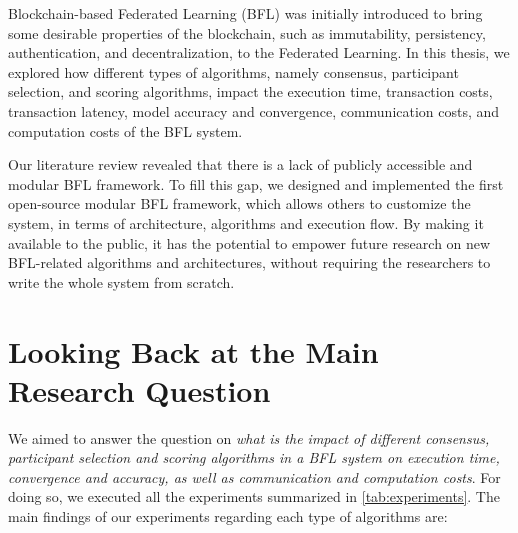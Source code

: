 Blockchain-based Federated Learning (BFL) was initially introduced to bring some desirable properties of the blockchain, such as immutability, persistency, authentication, and decentralization, to the Federated Learning. In this thesis, we explored how different types of algorithms, namely consensus, participant selection, and scoring algorithms, impact the execution time, transaction costs, transaction latency, model accuracy and convergence, communication costs, and computation costs of the BFL system.

Our literature review revealed that there is a lack of publicly accessible and modular BFL framework. To fill this gap, we designed and implemented the first open-source modular BFL framework, which allows others to customize the system, in terms of architecture, algorithms and execution flow. By making it available to the public, it has the potential to empower future research on new BFL-related algorithms and architectures, without requiring the researchers to write the whole system from scratch.

\section{Looking Back at the Main Research Question}

We aimed to answer the question on \textit{what is the impact of different consensus, participant selection and scoring algorithms in a BFL system on execution time, convergence and accuracy, as well as communication and computation costs}. For doing so, we executed all the experiments summarized in \autoref{tab:experiments}. The main findings of our experiments regarding each type of algorithms are:

